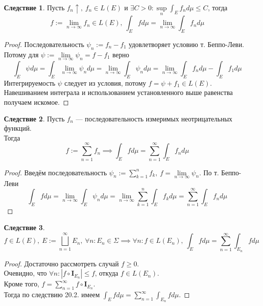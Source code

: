 \documentclass[11pt,a4paper]{report}
\theoremstyle{definition}
\theoremstyle{definition}
\newtheorem{corollary}{Следствие}[section]
\theoremstyle{definition}
\begin{document}
	\begin{corollary}
		Пусть $ f_{n} \uparrow,\ f_{n} \in L(E) $ и  $ \exists C > 0: \sup\limits_{n} \int_{E} f_{n} d\mu \le C $, тогда
		\[ f := \lim\limits_{n\to\infty} f_{n} \in L(E),\ \int_{E} f d\mu = \lim\limits_{n\to\infty} \int_{E} f_{n} d\mu \]
	\end{corollary}
	\begin{proof}
		Последовательность $ \psi_{n} := f_{n} - f_{1} $ удовлетворяет условию т. Беппо-Леви.\\
		Потому для $ \psi := \lim\limits_{n\to\infty} \psi_{n} = f - f_{1} $ верно
		\[  
			\int_{E} \psi d\mu = \int_{E} \lim\limits_{n\to\infty} \psi_{n} d\mu = \lim\limits_{n\to\infty} \int_{E} \psi_{n} d\mu = \lim\limits_{n\to\infty} \int_{E} f_{n} d\mu - \int_{E} f_{1} d\mu
		\]
		Интегрируемость $ \psi $ следует из условия, потому $ f = \psi + f_{1} \in L(E) $. Навешиванием интеграла и использованием установленного выше равенства получаем искомое.
	\end{proof}
	\begin{corollary}
		Пусть $ f_{n} $ — последовательность измеримых неотрицательных функций.\\
		Тогда 
		\[
			f := \sum\limits_{n=1}^{\infty} f_{n} \implies \int_{E} f d\mu = \sum\limits_{n=1}^{\infty} \int_{E} f_{n} d\mu
		\]
	\end{corollary}
	\begin{proof}
		Введём последовательность $ \psi_{n} := \sum_{k=1}^{n} f_{k},\ f = \lim\limits_{n\to\infty}\psi_{n} $. По т. Беппо-Леви
		\[
			\int_{E} f d\mu = \lim\limits_{n\to\infty} \int_{E} \psi_{n} d\mu = \lim\limits_{n\to\infty} \sum\limits_{k=1}^{n} \int_{E} f_{k} d\mu = \sum\limits_{n=1}^{\infty} \int_{E} f_{n} d\mu
		\]
	\end{proof}
	\begin{corollary}
		\[ f \in L(E),\ E := \bigsqcup\limits_{n=1}^{\infty} E_{n},\ \forall n: E_{n} \in \Sigma \implies \forall n: f \in L(E_{n}),\ \int_{E} f d\mu = \sum\limits_{n=1}^{\infty} \int_{E_{n}} f d\mu \]
	\end{corollary}
	\begin{proof}
		Достаточно рассмотреть случай $ f \ge 0 $.\\
		Очевидно, что $ \forall n: |f \circ \mathbf{I}_{E_{n}}| \le f $, откуда $ f \in L(E_{n}) $.\\
		Кроме того, $ f = \sum\limits_{n=1}^{\infty} f \circ \mathbf{I}_{E_{n}} $.\\
		Тогда по следствию 20.2. имеем $ \int_{E} f d\mu = \sum\limits_{n=1}^{\infty} \int_{E_{n}} f d\mu $.
	\end{proof}
\end{document}
